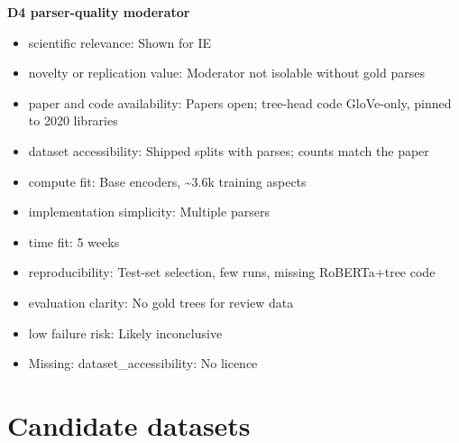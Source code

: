 \documentclass[11pt,a4paper]{article}
\begin{document}
\textbf{D4 parser-quality moderator}
\begin{itemize}
\item scientific relevance: Shown for IE \cite{sachan2021syntax}
\item novelty or replication value: Moderator not isolable without gold parses
\item paper and code availability: Papers open; tree-head code GloVe-only, pinned to 2020 libraries
\item dataset accessibility: Shipped splits with parses; counts match the paper
\item compute fit: Base encoders, \textasciitilde{}3.6k training aspects
\item implementation simplicity: Multiple parsers
\item time fit: 5 weeks
\item reproducibility: Test-set selection, few runs, missing RoBERTa+tree code
\item evaluation clarity: No gold trees for review data
\item low failure risk: Likely inconclusive
\item Missing: dataset\_accessibility: No licence
\end{itemize}

\section{Candidate datasets}
\end{document}
